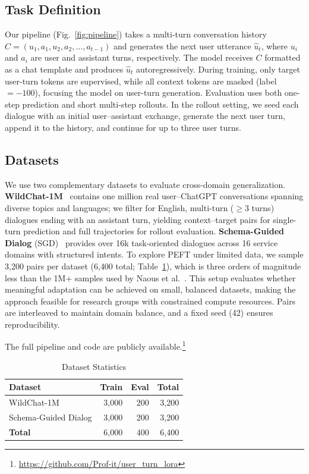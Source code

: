 \documentclass[conference]{IEEEtran}
\begin{document}
\subsection{Task Definition}

Our pipeline (Fig.~\ref{fig:pipeline}) takes a multi-turn conversation history $C = (u_1, a_1, u_2, a_2, \ldots, a_{t-1})$ and generates the next user utterance $\hat{u}_t$, where $u_i$ and $a_i$ are user and assistant turns, respectively. The model receives $C$ formatted as a chat template and produces $\hat{u}_t$ autoregressively. During training, only target user-turn tokens are supervised, while all context tokens are masked (label $= -100$), focusing the model on user-turn generation. Evaluation uses both one-step prediction and short multi-step rollouts. In the rollout setting, we seed each dialogue with an initial user--assistant exchange, generate the next user turn, append it to the history, and continue for up to three user turns.

\subsection{Datasets}

We use two complementary datasets to evaluate cross-domain generalization. \textbf{WildChat-1M}~\cite{zhao2024wildchat} contains one million real user--ChatGPT conversations spanning diverse topics and languages; we filter for English, multi-turn ($\geq$3 turns) dialogues ending with an assistant turn, yielding context--target pairs for single-turn prediction and full trajectories for rollout evaluation. \textbf{Schema-Guided Dialog} (SGD)~\cite{rastogi2020sgd} provides over 16k task-oriented dialogues across 16 service domains with structured intents. To explore PEFT under limited data, we sample 3{,}200 pairs per dataset (6{,}400 total; Table~\ref{tab:dataset}), which is three orders of magnitude less than the 1M+ samples used by Naous et al.~\cite{naous2025flipping}. This setup evaluates whether meaningful adaptation can be achieved on small, balanced datasets, making the approach feasible for research groups with constrained compute resources. Pairs are interleaved to maintain domain balance, and a fixed seed (42) ensures reproducibility.

The full pipeline and code are publicly available.\footnote{\url{https://github.com/Prof-it/user_turn_lora}}

\begin{table}[h]
\centering
\caption{Dataset Statistics}
\label{tab:dataset}
\begin{tabular}{lrrr}
\toprule
\textbf{Dataset} & \textbf{Train} & \textbf{Eval} & \textbf{Total} \\
\midrule
WildChat-1M & 3,000 & 200 & 3,200 \\
Schema-Guided Dialog & 3,000 & 200 & 3,200 \\
\midrule
\textbf{Total} & 6,000 & 400 & 6,400 \\
\bottomrule
\end{tabular}
\end{table}
\end{document}
